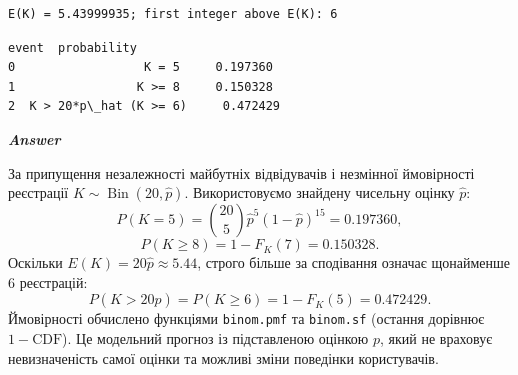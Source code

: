 \documentclass[11pt]{article}
\begin{document}
    \begin{Verbatim}[commandchars=\\\{\}]
E(K) = 5.43999935; first integer above E(K): 6
    \end{Verbatim}

    
    \begin{Verbatim}[commandchars=\\\{\}]
                   event  probability
0                  K = 5     0.197360
1                 K >= 8     0.150328
2  K > 20*p\_hat (K >= 6)     0.472429
    \end{Verbatim}

    
    \textbf{\emph{Answer}}

За припущення незалежності майбутніх відвідувачів і незмінної
ймовірності реєстрації \(K\sim\operatorname{Bin}(20,\widehat p)\).
Використовуємо знайдену чисельну оцінку \(\widehat p\):
\[P(K=5)=\binom{20}{5}\widehat p^5(1-\widehat p)^{15}=0.197360,\]
\[P(K\ge8)=1-F_K(7)=0.150328.\] Оскільки
\(E(K)=20\widehat p\approx5.44\), строго більше за сподівання означає
щонайменше 6 реєстрацій:
\[P(K>20\widehat p)=P(K\ge6)=1-F_K(5)=0.472429.\] Ймовірності обчислено
функціями \texttt{binom.pmf} та \texttt{binom.sf} (остання дорівнює
\(1-\mathrm{CDF}\)). Це модельний прогноз із підставленою оцінкою \(p\),
який не враховує невизначеність самої оцінки та можливі зміни поведінки
користувачів.


    
    
    
\end{document}

